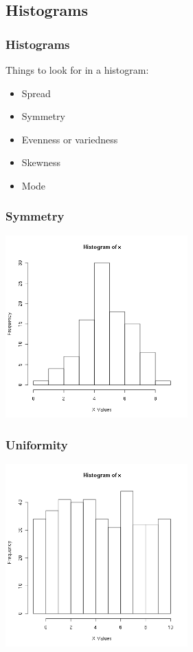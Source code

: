 \subsection{Histograms}

\begin{frame}
  \frametitle{Histograms}

  Things to look for in a histogram:\\
  \begin{itemize}
  \item Spread
  \item Symmetry
  \item Evenness or variedness
  \item Skewness
  \item Mode
  \end{itemize}

\end{frame}


\begin{frame}
  \frametitle{Symmetry}

  \includegraphics[width=7cm]{img/symmetricW1D2}

\end{frame}

\begin{frame}
  \frametitle{Uniformity}

  \includegraphics[width=7cm]{img/uniformW1D2}

\end{frame}


